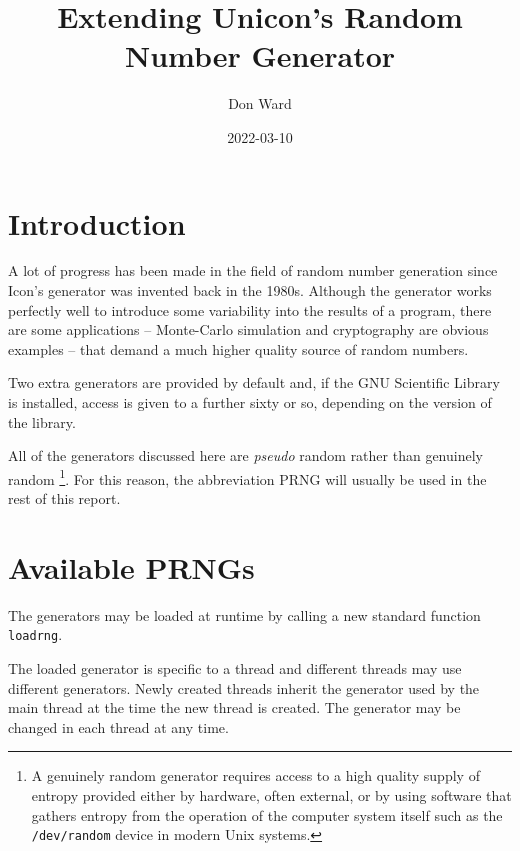\documentclass[letterpaper,12pt]{article}
\title{Extending Unicon's Random\\ Number Generator}
\author{Don Ward}
\date{2022-03-10}
\begin{document}
\maketitle
%
\newcommand{\rndkwd}{{\sf \&random}\ }
\newcommand{\rndlibkwd}{{\sf \&rnglib}\ }
\newcommand{\UniconError}[2]{{\sf#1} --- {\sf #2}}
\newcommand{\surl}[1]{{\small\url{#1}}}
%
\section{Introduction}
A lot of progress has been made in the field of random number generation since Icon's
generator was invented back in the 1980s. Although the generator works perfectly well to
introduce some variability into the results of a program, there are some applications --
Monte-Carlo simulation and cryptography are obvious examples -- that demand a much higher
quality source of random numbers.

Two extra generators are provided by default and, if the GNU Scientific Library is
installed, access is given to a further sixty or so, depending on the version of the
library.

All of the generators discussed here are {\em pseudo} random rather than genuinely random%
\footnote{
  A genuinely random generator requires access to a high quality supply of
  entropy provided either by hardware, often external, or by using software
  that gathers entropy from the operation of the computer system itself
  such as the \texttt{/dev/random} device in modern Unix systems.
}.
For this reason, the abbreviation PRNG will usually be used in the rest of this report.

\section{Available PRNGs}

The generators may be loaded at runtime by calling a new standard function \texttt{loadrng}.

The loaded generator is specific to a thread and different threads may use different
generators. Newly created threads inherit the generator used by the main thread at the
time the new thread is created. The generator may be changed in each thread at any time.
\end{document}

